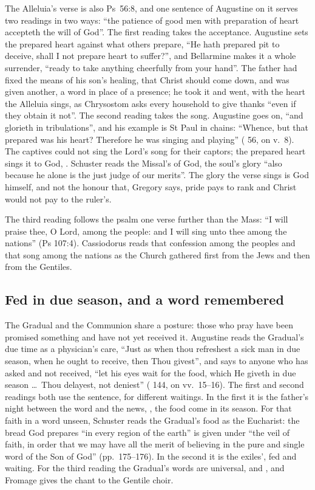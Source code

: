 The Alleluia's verse is also Ps~56:8, and one sentence of Augustine on it
serves two readings in two ways: ``the patience of good men with preparation of
heart accepteth the will of God''. The first reading takes the acceptance.
Augustine sets the prepared heart against what others prepare, ``He hath
prepared pit to deceive, shall I not prepare heart to suffer?'', and Bellarmine
makes it a whole surrender, ``ready to take anything cheerfully from your
hand''. The father had fixed the means of his son's healing, that Christ should
come down, and was given another, a word in place of a presence; he took it and
went, with the heart the Alleluia sings, as Chrysostom asks every household to
give thanks ``even if they obtain it not''. The second reading takes the song.
Augustine goes on, ``and glorieth in tribulations'', and his example is St Paul
in chains: ``Whence, but that prepared was his heart? Therefore he was singing
and playing'' ( 56, on v.~8). The captives could
not sing the Lord's song for their captors; the prepared heart sings it to God,
. Schuster reads the Missal's  of God, the
soul's glory ``also because he alone is the just judge of our merits''. The
glory the verse sings is God himself, and not the honour that, Gregory says,
pride pays to rank and Christ would not pay to the ruler's.

The third reading follows the psalm one verse further than the Mass: ``I will
praise thee, O Lord, among the people: and I will sing unto thee among the
nations'' (Ps 107:4). Cassiodorus reads that confession among the peoples and
that song among the nations as the Church gathered first from the Jews and
then from the Gentiles.

\subsection{Fed in due season, and a word remembered}

The Gradual and the Communion share a posture: those who pray have been
promised something and have not yet received it. Augustine reads the
Gradual's due time as a physician's care, ``Just as when thou refreshest a
sick man in due season, when he ought to receive, then Thou givest'', and says
to anyone who has asked and not received, ``let his eyes wait for the food,
which He giveth in due season \dots\ Thou delayest, not deniest''
( 144, on vv.~15--16). The first and second
readings both use the sentence, for different waitings. In the first it is the
father's night between the word and the news, , the
food come in its season. For that faith in a word unseen, Schuster reads the
Gradual's food as the Eucharist: the bread
God prepares ``in every region of the earth'' is given under ``the veil of faith,
in order that we may have all the merit of believing in the pure and single
word of the Son of God'' (pp.~175--176). In the second it is the exiles', fed
and waiting. For the third reading the Gradual's words are universal,
 and , and Fromage gives the chant to the
Gentile choir.

